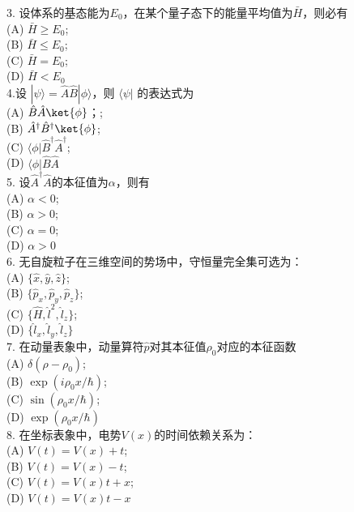 3. 设体系的基态能为$E_0$，在某个量子态下的能量平均值为$\bar{H} $，则必有\\
   (A) $\bar{H} \geq E_0$; \\
   (B) $\bar{H} \leq E_0$; \\
   (C) $\bar{H} = E_0$; \\
   (D) $\bar{H}< E_0$\\

4.设 $|\psi\rangle = \hat{A}\hat{B}|\phi\rangle$，则 $\langle \psi |$ 的表达式为\\
   (A) $\hat{B} \hat{A}\ket{\phi}$；; \\
   (B) $ \hat{A}^\dagger \hat{B}^\dagger \ket{\phi}$; \\
   (C) $\langle \phi | \hat{B}^{\dagger} \hat{A}^{\dagger}$; \\
   (D)  $\langle \phi | \hat{B} \hat{A}$\\

5. 设$\hat{A}^\dagger \hat{A}$的本征值为$\alpha$，则有\\
   (A) $\alpha<0$; \\
   (B) $\alpha>0$; \\
   (C) $\alpha=0$; \\
   (D) $\alpha>0$\\

6. 无自旋粒子在三维空间的势场中，守恒量完全集可选为：\\
   (A) $\{\hat{x}, \hat{y}, \hat{z}\}$; \\
   (B)  $\{\hat{p}_x, \hat{p}_y,\hat{p}_z\}$; \\
   (C) $\{\hat{H},\hat{l}^2,  \hat{l}_z\}$; \\
   (D) $\{\hat{l}_x, \hat{l}_y,\hat{l}_z\}$\\

7. 在动量表象中，动量算符$\hat{p}$对其本征值$\rho_0$对应的本征函数\\
   (A) $\delta(\rho-\rho_0)$; \\
   (B) $\exp(i\rho_0 x/\hbar)$; \\
   (C) $\sin(\rho_0 x/\hbar)$; \\
   (D) $\exp(\rho_0 x/\hbar)$\\

8. 在坐标表象中，电势$V(x)$的时间依赖关系为：\\
   (A) $V(t) = V(x) + t$; \\
   (B) $V(t) = V(x) - t$; \\
   (C) $V(t) = V(x) t + x$; \\
   (D) $V(t) = V(x) t - x$\\